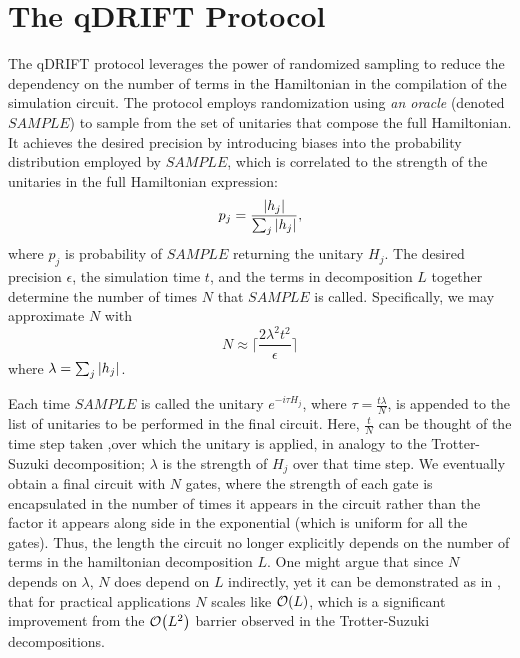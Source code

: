 \documentclass[letterpaper, 11pt]{article}
\begin{document}
\section*{The qDRIFT Protocol}
The qDRIFT protocol leverages the power of randomized sampling to reduce the dependency on the number of terms in the Hamiltonian in the compilation of the simulation circuit. The protocol employs randomization using \textit{an oracle} (denoted $SAMPLE$) to sample from the set of unitaries that compose the full Hamiltonian. It achieves the desired precision by introducing biases into the probability distribution employed by $SAMPLE$, which is correlated to the strength of the unitaries in the full Hamiltonian expression:
\begin{equation}
    p_j = \frac{\abs{h_j}}{\sum_j \abs{h_j}},
\end{equation}
where $p_j$ is probability of $SAMPLE$ returning the unitary $H_j$. The desired precision $\epsilon$, the simulation time $t$, and the terms in decomposition $L$ together determine the number of times $N$ that $SAMPLE$ is called. Specifically, we may approximate $N$ with
\begin{equation}
    N \approx \Big\lceil \frac{2 \lambda^2 t^2}{\epsilon}\Big\rceil
\end{equation}
where $\lambda = \sum_j \abs{h_j}$. \smallskip

Each time $SAMPLE$ is called the unitary $e^{-i \tau H_j}$, where $\tau = \frac{t \lambda}{N}$, is appended to the list of unitaries to be performed in the final circuit. Here, $\frac{t}{N}$ can be thought of the time step taken ,over which the unitary is applied, in analogy to the Trotter-Suzuki decomposition; $\lambda$ is the strength of $H_j$ over that time step. We eventually obtain a final circuit with $N$ gates, where the strength of each gate is encapsulated in the number of times it appears in the circuit rather than the factor it appears along side in the exponential (which is uniform for all the gates). Thus, the length the circuit no longer explicitly depends on the number of terms in the hamiltonian decomposition $L$. One might argue that since $N$ depends on $\lambda$, $N$ does depend on $L$ indirectly, yet it can be demonstrated as in \cite{PhysRevLett.123.070503}, that for practical applications $N$ scales like $\order{L}$, which is a significant improvement from the $\order{L^2}$ barrier observed in the Trotter-Suzuki decompositions. 
\end{document}
